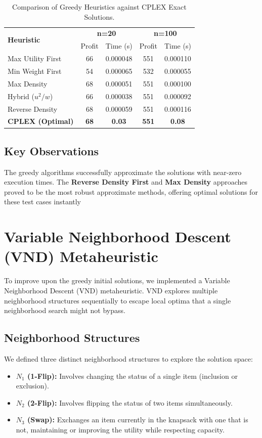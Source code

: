 \documentclass[11pt,a4paper]{article}
\begin{document}
\begin{table}[htbp]
    \centering
    \small
    \begin{tabular}{|l|cc|cc|}
        \hline
        \multirow{2}{*}{\textbf{Heuristic}} & \multicolumn{2}{c|}{\textbf{n=20}} & \multicolumn{2}{c|}{\textbf{n=100}} \\
        & Profit & Time (s) & Profit & Time (s) \\
        \hline
        Max Utility First & 66 & 0.000048 & 551 & 0.000110 \\
        Min Weight First  & 54 & 0.000065 & 532 & 0.000055 \\
        Max Density       & 68 & 0.000051 & 551 & 0.000100 \\
        Hybrid ($u^2/w$)  & 66 & 0.000038 & 551 & 0.000092 \\
        Reverse Density   & 68 & 0.000059 & 551 & 0.000116 \\
        \hline
        \textbf{CPLEX (Optimal)} & \textbf{68} & \textbf{0.03} & \textbf{551} & \textbf{0.08} \\
        \hline
    \end{tabular}
    \caption{Comparison of Greedy Heuristics against CPLEX Exact Solutions.}
\end{table}

\subsection{Key Observations}
The greedy algorithms successfully approximate the solutions with near-zero execution times. The \textbf{Reverse Density First} and \textbf{Max Density} approaches proved to be the most robust approximate methods, offering optimal solutions for these test cases instantly
\section{Variable Neighborhood Descent (VND) Metaheuristic}

To improve upon the greedy initial solutions, we implemented a Variable Neighborhood Descent (VND) metaheuristic. VND explores multiple neighborhood structures sequentially to escape local optima that a single neighborhood search might not bypass.

\subsection{Neighborhood Structures}
We defined three distinct neighborhood structures to explore the solution space:
\begin{itemize}
    \item \textbf{$N_1$ (1-Flip):} Involves changing the status of a single item (inclusion or exclusion).
    \item \textbf{$N_2$ (2-Flip):} Involves flipping the status of two items simultaneously.
    \item \textbf{$N_3$ (Swap):} Exchanges an item currently in the knapsack with one that is not, maintaining or improving the utility while respecting capacity.
\end{itemize}
\end{document}
